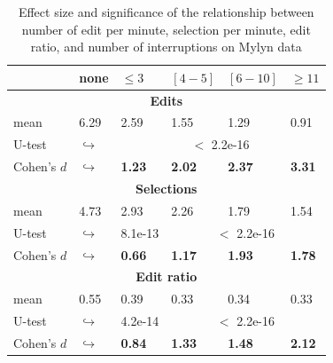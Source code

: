 \documentclass[times]{smrauth}
\begin{document}
\begin{table}[ht!]
\tiny
\renewcommand{\arraystretch}{1.3}
\caption{Effect size and significance of the relationship between number of edit per minute, selection per minute, edit ratio, and number of interruptions on Mylyn data} 
\label{tbl:p_value}
\centering
\begin{tabular}{l | p{0.75cm} | p{1.2cm} | p{1.2cm} | p{1.2cm} |p{1.2cm}} 

   & none & $\leq 3$ & $[4 - 5]$ & $[6 - 10]$ & $\geq 11$  \\  
  \hline
  \multicolumn{6}{c}{\textbf{Edits}} \\
  \hline
  mean & 6.29 &	2.59 & 1.55 & 1.29 & 0.91  \\ 
   \cline{3-6} 
  U-test & $\hookrightarrow$ & \multicolumn{4}{c}{$<$ 2.2e-16} \\
  \cline{3-6} 
  Cohen's $d$ & $\hookrightarrow$	& \textbf{1.23} & \textbf{2.02} & \textbf{2.37} & \textbf{3.31}    \\
  \hline
  
  
  \multicolumn{6}{c}{\textbf{Selections}} \\
  \hline 
  mean & 4.73 &	2.93 & 2.26 & 1.79 & 1.54  \\ 
     \cline{3-6} 
    U-test & $\hookrightarrow$ & 8.1e-13 & \multicolumn{3}{c}{$<$ 2.2e-16} \\
    
  \cline{3-6} 
  Cohen's $d$ & $\hookrightarrow$	& \textbf{0.66} & \textbf{1.17} & \textbf{1.93} & \textbf{1.78} \\  
\hline


  \multicolumn{6}{c}{\textbf{Edit ratio}} \\
  \hline 
  mean & 0.55 & 0.39 & 0.33 & 0.34 & 0.33 \\ 
  \cline{3-6} 
     \cline{3-6} 
    U-test & $\hookrightarrow$ & 4.2e-14 & \multicolumn{3}{c}{$<$ 2.2e-16} \\
    \cline{3-6} 
    Cohen's $d$ & $\hookrightarrow$ & \textbf{0.84} & \textbf{1.33} & \textbf{1.48} & \textbf{2.12} \\ 
\hline

\end{tabular}
\end{table}
\end{document}
